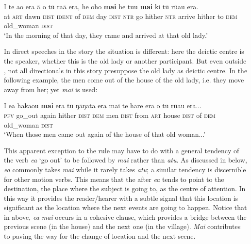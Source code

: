 \ea\label{ex:7.135}
\gll {\ꞌ}I te {\ꞌ}ao era {\ꞌ}ā o tū ra{\ꞌ}ā era, he oho \textbf{mai} he tu{\ꞌ}u \textbf{mai}  ki tū rū{\ꞌ}au era.\\
at \textsc{art} dawn \textsc{dist} \textsc{ident} of \textsc{dem} day \textsc{dist} \textsc{ntr} go hither \textsc{ntr} arrive hither  to \textsc{dem} old\_woman \textsc{dist}\\

\glt
‘In the morning of that day, they came and arrived at that old lady.’ \textstyleExampleref{[R368.063]} 
\z

In direct speeches in the story the situation is different: here the deictic centre is the speaker, whether this is the old lady or another participant. But even outside , not all directionals in this story presuppose the old lady as deictic centre. In the following example, the men come out of the house of the old lady, i.e. they move away from her; yet \textit{mai} is used:

\ea\label{ex:7.136}
\gll I e{\ꞌ}a haka{\ꞌ}ou \textbf{mai} era tū ŋāŋata era mai te hare era  o tū rū{\ꞌ}au era...\\
\textsc{pfv} go\_out again hither \textsc{dist} \textsc{dem} men \textsc{dist} from \textsc{art} house \textsc{dist}  of \textsc{dem} old\_woman \textsc{dist}\\

\glt
‘When those men came out again of the house of that old woman...’ \textstyleExampleref{[R368.056]} 
\z

This apparent exception to the rule may have to do with a general tendency of the verb \textit{e{\ꞌ}a} ‘go out’ to be followed by \textit{mai} rather than \textit{atu}. As discussed in  below, \textit{e{\ꞌ}a} commonly takes \textit{mai} while it rarely takes \textit{atu}; a similar tendency is discernible for other motion verbs. This means that the  after \textit{e{\ꞌ}a} tends to point to the destination, the place where the subject is going to, as the centre of attention. In this way it provides the reader/hearer with a subtle signal that this location is significant as the location where the next events are going to happen. Notice that in  above, \textit{e{\ꞌ}a mai} occurs in a cohesive clause, which provides a bridge between the previous scene (in the house) and the next one (in the village). \textit{Mai} contributes to paving the way for the change of location and the next scene.

